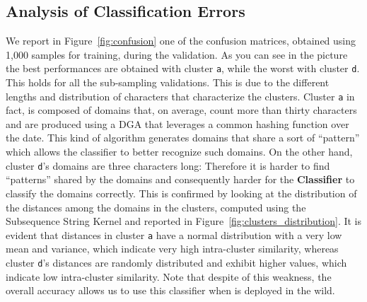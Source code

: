 \subsection{Analysis of Classification Errors} %
\label{sub:analysis_of_classification_errors}
We report in Figure~\ref{fig:confusion} one of the confusion matrices, obtained using
1,000 samples for training, during the validation. As you can see in the picture the best performances
are obtained with cluster \texttt{a}, while the worst with cluster \texttt{d}.
This holds for all the sub-sampling validations.
This is due to the different lengths and distribution of characters that
characterize the clusters.
Cluster \texttt{a} in fact, is composed of domains that,
on average, count more than thirty characters and are produced using a DGA
that leverages a common hashing function over the date. This kind
of algorithm generates domains that share a sort of ``pattern'' which
allows the classifier to better recognize such domains. On the other hand,
cluster \texttt{d}'s domains are three characters long: Therefore it is harder
to find ``patterns'' shared by the domains and consequently harder for the
\textbf{Classifier} to classify the domains correctly. This is confirmed by looking at
the distribution of the distances among the domains in the clusters,
computed using the Subsequence String Kernel and reported in Figure~\ref{fig:clusters_distribution}. It is evident that distances
in cluster \texttt{a} have a normal distribution with a very low mean and
variance, which indicate very high intra-cluster similarity, whereas cluster \texttt{d}'s distances are randomly distributed and
exhibit higher values, which indicate low intra-cluster similarity. Note that despite of this
weakness, the overall accuracy allows us to use this classifier when
\thesystem is deployed in the wild.
